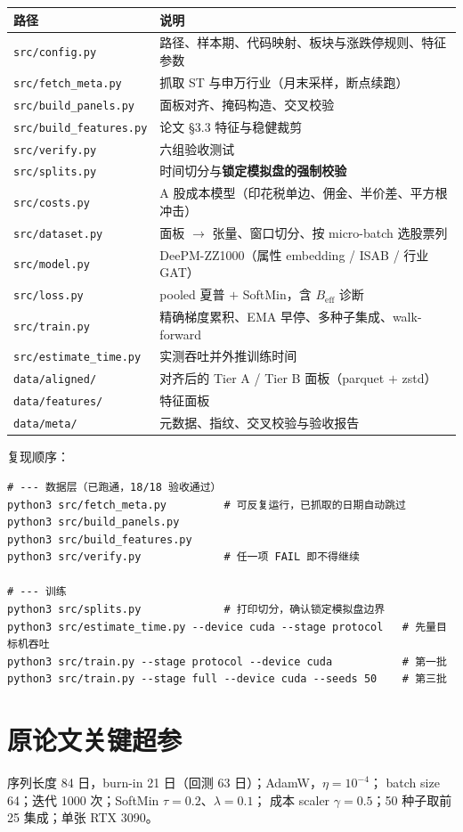 \documentclass[11pt, a4paper]{ctexart}
\newcommand{\file}[1]{\texttt{\small #1}}
\begin{document}
\begin{table}[h]
\centering
\small
\begin{tabular}{ll}
\toprule
路径 & 说明 \\
\midrule
\file{src/config.py} & 路径、样本期、代码映射、板块与涨跌停规则、特征参数 \\
\file{src/fetch\_meta.py} & 抓取 ST 与申万行业（月末采样，断点续跑） \\
\file{src/build\_panels.py} & 面板对齐、掩码构造、交叉校验 \\
\file{src/build\_features.py} & 论文 §3.3 特征与稳健裁剪 \\
\file{src/verify.py} & 六组验收测试 \\
\file{src/splits.py} & 时间切分与\textbf{锁定模拟盘的强制校验} \\
\file{src/costs.py} & A 股成本模型（印花税单边、佣金、半价差、平方根冲击） \\
\file{src/dataset.py} & 面板 $\to$ 张量、窗口切分、按 micro-batch 选股票列 \\
\file{src/model.py} & DeePM-ZZ1000（属性 embedding / ISAB / 行业 GAT） \\
\file{src/loss.py} & pooled 夏普 $+$ SoftMin，含 $B_{\text{eff}}$ 诊断 \\
\file{src/train.py} & 精确梯度累积、EMA 早停、多种子集成、walk-forward \\
\file{src/estimate\_time.py} & 实测吞吐并外推训练时间 \\
\file{data/aligned/} & 对齐后的 Tier A / Tier B 面板（parquet $+$ zstd） \\
\file{data/features/} & 特征面板 \\
\file{data/meta/} & 元数据、指纹、交叉校验与验收报告 \\
\bottomrule
\end{tabular}
\end{table}

\noindent 复现顺序：
\begin{verbatim}
# --- 数据层（已跑通，18/18 验收通过）
python3 src/fetch_meta.py         # 可反复运行，已抓取的日期自动跳过
python3 src/build_panels.py
python3 src/build_features.py
python3 src/verify.py             # 任一项 FAIL 即不得继续

# --- 训练
python3 src/splits.py             # 打印切分，确认锁定模拟盘边界
python3 src/estimate_time.py --device cuda --stage protocol   # 先量目标机吞吐
python3 src/train.py --stage protocol --device cuda           # 第一批
python3 src/train.py --stage full --device cuda --seeds 50    # 第三批
\end{verbatim}

\section{原论文关键超参}
序列长度 84 日，burn-in 21 日（回测 63 日）；AdamW，$\eta=10^{-4}$；
batch size 64；迭代 1000 次；SoftMin $\tau=0.2$、$\lambda=0.1$；
成本 scaler $\gamma=0.5$；50 种子取前 25 集成；单张 RTX 3090。
\end{document}

